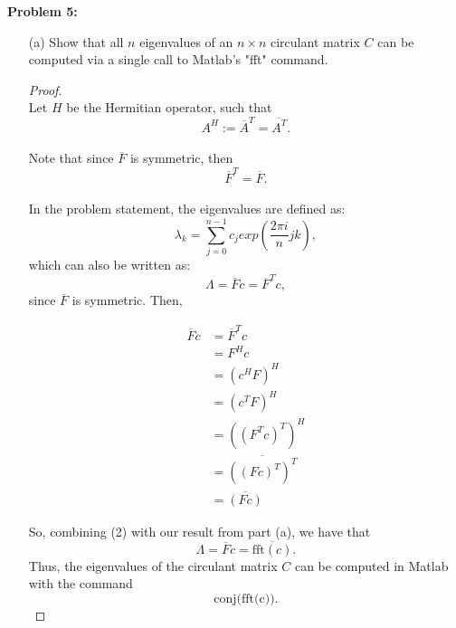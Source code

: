 \documentclass[12pt]{article}
\begin{document}
\bigskip\bigskip
\noindent
\textbf{Problem 5:} 
\begin{itemize}
\item[(a)] Show that all $n$ eigenvalues of an $n\times n$ circulant matrix $C$ can be computed via a single call to Matlab's "fft" command.\\
\begin{proof} $\text{ }$\\
Let $H$ be the Hermitian operator, such that 
$$A^H := \overline{A}^T = \overline{A^T}.$$\\
Note that since $\overline{F}$ is symmetric, then
$$\overline{F}^T = \overline{F}.$$\\
In the problem statement, the eigenvalues are defined as:
$$\lambda_k = \sum_{j=0}^{n-1} c_j exp \left(\frac{2\pi i}{n}jk \right),$$
which can also be written as:
$$\Lambda = \overline{F}c = \overline{F}^Tc,$$
since $\overline{F}$ is symmetric.  Then,

\begin{align}
\overline{F}c &= \overline{F}^Tc \nonumber \\
&= F^Hc \nonumber \\
&= \left(c^H F\right)^H \nonumber \\
&= \left( c^T F \right)^H \nonumber \\
&= \left(\left(F^T c \right)^T\right)^H \nonumber \\
&= \overline{\left(\left(Fc\right)^T\right)^T} \nonumber \\
&= \overline{(Fc)} 
\end{align}

So, combining (2) with our result from part (a), we have that 
$$\Lambda = \overline{F}c = \overline{\text{fft}(c)}.$$
Thus, the eigenvalues of the circulant matrix $C$ can be computed in Matlab with the command
$$\text{conj(fft(c))}.$$

\end{proof}


\end{itemize}
\end{document}
